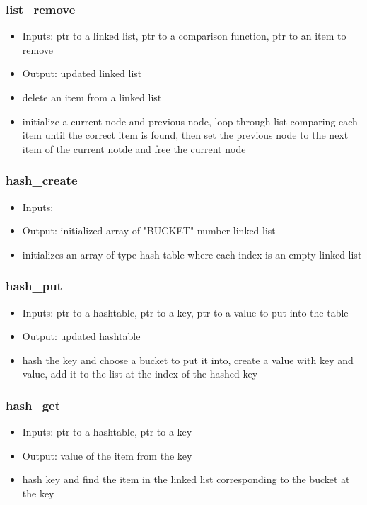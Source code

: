 \documentclass{article}
\begin{document}
\subsubsection{list_remove}
\begin{itemize}
    \item Inputs: ptr to a linked list, ptr to a comparison function, ptr to an item to remove
    \item Output: updated linked list
    \item delete an item from a linked list 
    \item initialize a current node and previous node, loop through list comparing each item until the correct item is found, then set the previous node to the next item of the current notde and free the current node
\end{itemize}
\subsubsection{hash_create}
\begin{itemize}
    \item Inputs:
    \item Output: initialized array of "BUCKET" number linked list
    \item initializes an array of type hash table where each index is an empty linked list
\end{itemize}
\subsubsection{hash_put}
\begin{itemize}
    \item Inputs: ptr to a hashtable, ptr to a key, ptr to a value to put into the table
    \item Output: updated hashtable
    \item hash the key and choose a bucket to put it into, create a value with key and value, add it to the list at the index of the hashed key
\end{itemize}
\subsubsection{hash_get}
\begin{itemize}
    \item Inputs: ptr to a hashtable, ptr to a key
    \item Output: value of the item from the key
    \item hash key and find the item in the linked list corresponding to the bucket at the key 
\end{itemize}
\end{document}
